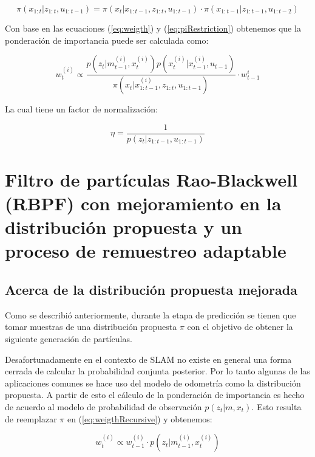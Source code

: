 \documentclass[10pt,a4paper]{article}
\begin{document}
	\begin{equation}
	\label{eq:piRestriction}
		\pi (x_{1:t} | z_{1:t}, u_{1:t-1})	= 
			\pi ( x_{t} | x_{1:t-1}, z_{1:t}, u_{1:t-1}) \cdot
			\pi ( x_{1:t-1} | z_{1:t-1}, u_{1:t-2})
	\end{equation}

Con base en las ecuaciones (\ref{eq:weigth}) y (\ref{eq:piRestriction}) obtenemos que la ponderación de importancia puede ser calculada como:

	\begin{equation}
	\label{eq:weigthRecursive}
		w_{t}^{(i)} \propto
			\frac{ p( z_{t} | m_{t-1}^{(i)}, x_{t}^{(i)} ) 
			       p( x_{t}^{(i)} | x_{t-1}^{(i)}, u_{t-1} )
			 }{\pi ( x_{t} | x_{1:t-1}^{(i)}, z_{1:t}, u_{1:t-1} ) } \cdot
			 w_{t-1}^{i}
	\end{equation}
	
La cual tiene un factor de normalización:

	\begin{equation}
	\eta
		= \frac{1}{p( z_{t} | z_{1:t-1}, u_{1:t-1} )}
	\end{equation} 

\section{Filtro de partículas Rao-Blackwell (RBPF) con mejoramiento en la distribución propuesta y un proceso de remuestreo adaptable}

\subsection{Acerca de la distribución propuesta mejorada}

Como se describió anteriormente, durante la etapa de predicción se tienen que tomar muestras de una distribución propuesta $ \pi $ con el objetivo de obtener la siguiente generación de partículas.

Desafortunadamente en el contexto de SLAM no existe en general una forma cerrada de calcular la probabilidad conjunta posterior. Por lo tanto algunas de las aplicaciones comunes se hace uso del modelo de odometría como la distribución propuesta. A partir de esto el cálculo de la ponderación de importancia es hecho de acuerdo al modelo de probabilidad de observación $ p( z_{t} | m, x_{t} ) $. Esto resulta de reemplazar $ \pi $ en (\ref{eq:weigthRecursive}) y obtenemos:

	\begin{equation}
		w_{t}^{(i)} \propto
			w_{t-1}^{(i)} \cdot p( z_{t} | m_{t-1}^{(i)}, x_{t}^{(i)} )
	\end{equation}
\end{document}
